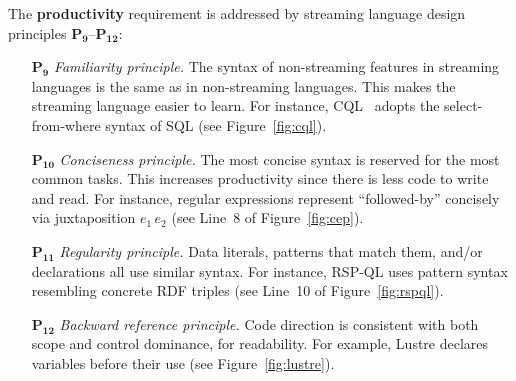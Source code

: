 The \textbf{productivity} requirement is addressed by streaming
language design principles $\mathbf{P_9}$--$\mathbf{P_{12}}$:
\begin{itemize}[leftmargin=6mm]
  \item[$\mathbf{P_9}$] \emph{Familiarity principle.} The syntax of
    non-streaming features in streaming languages is the same as in
    non-streaming languages. This makes the streaming language easier
    to learn. For instance, CQL~\cite{arasu_widom_2004} adopts the
    select-from-where syntax of SQL (see Figure~\ref{fig:cql}).
  \item[$\mathbf{P_{10}}$] \emph{Conciseness principle.} The most concise
    syntax is reserved for the most common tasks. This increases
    productivity since there is less code to write and read. For
    instance, regular expressions represent ``followed-by'' concisely
    via juxtaposition \mbox{$e_1\,e_2$} (see Line~8 of
    Figure~\ref{fig:cep}).
  \item[$\mathbf{P_{11}}$] \emph{Regularity principle.} Data literals,
    patterns that match them, and/or declarations all use similar
    syntax. For instance, RSP-QL uses pattern syntax resembling
    concrete RDF triples (see Line~10 of Figure~\ref{fig:rspql}).
  \item[$\mathbf{P_{12}}$] \emph{Backward reference principle.} Code
    direction is consistent with both scope and control dominance, for
    readability. For example, Lustre declares variables before their
    use (see Figure~\ref{fig:lustre}).
\end{itemize}

